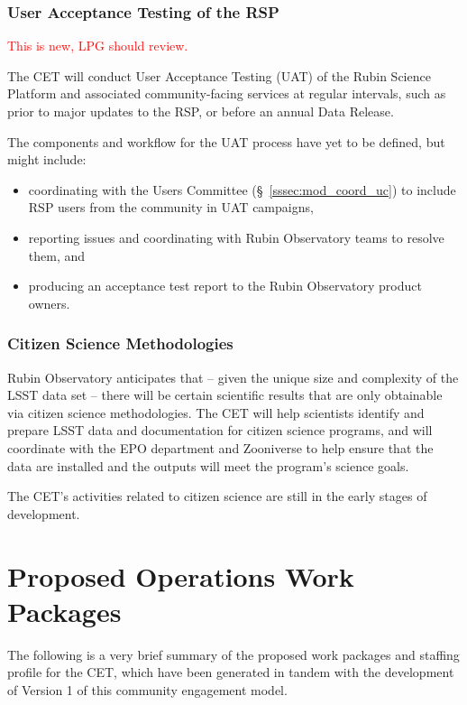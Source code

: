 \documentclass[DM,lsstdraft,toc]{lsstdoc}
\begin{document}
\subsubsection{User Acceptance Testing of the RSP}\label{sssec:mod_dev_uat}

\textcolor{red}{This is new, LPG should review.}

The CET will conduct User Acceptance Testing (UAT) of the Rubin Science Platform and associated community-facing services at regular intervals, such as prior to major updates to the RSP, or before an annual Data Release.

The components and workflow for the UAT process have yet to be defined, but might include:
\begin{itemize}
\item coordinating with the Users Committee (\S~\ref{sssec:mod_coord_uc}) to include RSP users from the community in UAT campaigns,
\item reporting issues and coordinating with Rubin Observatory teams to resolve them, and
\item producing an acceptance test report to the Rubin Observatory product owners.
\end{itemize}


\subsubsection{Citizen Science Methodologies}\label{sssec:mod_dev_citizen}

Rubin Observatory anticipates that -- given the unique size and complexity of the LSST data set -- there will be certain scientific results that are only obtainable via citizen science methodologies.
The CET will help scientists identify and prepare LSST data and documentation for citizen science programs, and will coordinate with the EPO department and Zooniverse to help ensure that the data are installed and the outputs will meet the program's science goals.

The CET's activities related to citizen science are still in the early stages of development.






\section{Proposed Operations Work Packages}\label{sec:comp}

The following is a very brief summary of the proposed work packages and staffing profile for the CET, which have been generated in tandem with the development of Version 1 of this community engagement model.
\end{document}
